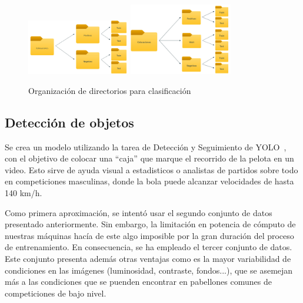 \documentclass[12pt]{report} %
\begin{document}
    \begin{figure}[H]
        \includegraphics[width=0.4\textwidth]{folders_binario.jpeg}
        \hspace{0.3cm}
        \includegraphics[width=0.4\textwidth]{folders_ternario.jpg}
        \caption {Organización de directorios para clasificación}
    \end{figure}

    
    \subsection{Detección de objetos}
    Se crea un modelo utilizando la tarea de Detección y Seguimiento de YOLO~\cite{YOLODetect}, con el objetivo de colocar una ``caja'' que marque el recorrido de la pelota en un video. Esto sirve de ayuda visual a estadisticos o analistas de partidos sobre todo en competiciones masculinas, donde la bola puede alcanzar velocidades de hasta 140 km/h. 

    Como primera aproximación, se intentó usar el segundo conjunto de datos presentado anteriormente. Sin embargo, la limitación en potencia de cómputo de nuestras máquinas hacía de este algo imposible por la gran duración del proceso de entrenamiento. En consecuencia, se ha empleado el tercer conjunto de datos. Este conjunto presenta además otras ventajas como es la mayor variabilidad de condiciones en las imágenes (luminosidad, contraste, fondos...), que se asemejan más a las condiciones que se puenden encontrar en pabellones comunes de competiciones de bajo nivel.
\end{document}
